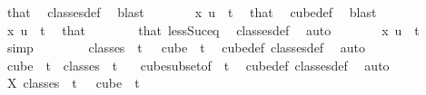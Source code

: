 \begin{isabellebody}
\ that\ \isamarkupfalse%
\ classes{\isacharunderscore}{\kern0pt}def\ \isamarkupfalse%
\ blast\isanewline
\ \ \ \ \isamarkupfalse%
\ \isamarkupfalse%
\ {\isachardoublequoteopen}x\ u\ {\isasymin}\ {\isacharbraceleft}{\kern0pt}{\isachardot}{\kern0pt}{\isachardot}{\kern0pt}{\isacharless}{\kern0pt}t{\isacharplus}{\kern0pt}{}{\isacharbraceright}{\kern0pt}{\isachardoublequoteclose}\ \isamarkupfalse%
\ that\ \isamarkupfalse%
\ cube{\isacharunderscore}{\kern0pt}def\ \isamarkupfalse%
\ blast\isanewline
\ \ \ \ \isamarkupfalse%
\ \isamarkupfalse%
\ {\isachardoublequoteopen}x\ u\ {\isasymin}\ {\isacharbraceleft}{\kern0pt}{\isachardot}{\kern0pt}{\isachardot}{\kern0pt}{\isacharless}{\kern0pt}t{\isacharbraceright}{\kern0pt}{\isachardoublequoteclose}\ \isamarkupfalse%
\ that\isanewline
\ \ \ \ \ \ \isamarkupfalse%
\ that\ less{\isacharunderscore}{\kern0pt}Suc{\isacharunderscore}{\kern0pt}eq\ \isamarkupfalse%
\ classes{\isacharunderscore}{\kern0pt}def\ \isamarkupfalse%
\ auto\isanewline
\ \ \ \ \isamarkupfalse%
\ \isamarkupfalse%
\ {\isachardoublequoteopen}x\ u\ {\isacharless}{\kern0pt}\ t{\isachardoublequoteclose}\ \isamarkupfalse%
\ simp\isanewline
\ \ \isamarkupfalse%
\isanewline
\ \ \isamarkupfalse%
\ \isamarkupfalse%
\ {\isachardoublequoteopen}classes\ {}\ t\ {}\ {\isasymsubseteq}\ cube\ {}\ t{\isachardoublequoteclose}\ \isamarkupfalse%
\ cube{\isacharunderscore}{\kern0pt}def\ classes{\isacharunderscore}{\kern0pt}def\ \isamarkupfalse%
\ auto\isanewline
\ \ \isamarkupfalse%
\ \isamarkupfalse%
\ {\isachardoublequoteopen}cube\ {}\ t\ {\isasymsubseteq}\ classes\ {}\ t\ {}{\isachardoublequoteclose}\ \isamarkupfalse%
\ cube{\isacharunderscore}{\kern0pt}subset{\isacharbrackleft}{\kern0pt}of\ {}\ t{\isacharbrackright}{\kern0pt}\ \isamarkupfalse%
\ cube{\isacharunderscore}{\kern0pt}def\ classes{\isacharunderscore}{\kern0pt}def\ \isamarkupfalse%
\ auto\isanewline
\ \ \isamarkupfalse%
\ \isamarkupfalse%
\ X{\isacharcolon}{\kern0pt}\ {\isachardoublequoteopen}classes\ {}\ t\ {}\ {\isacharequal}{\kern0pt}\ cube\ {}\ t{\isachardoublequoteclose}\ \isamarkupfalse%

\end{isabellebody}
